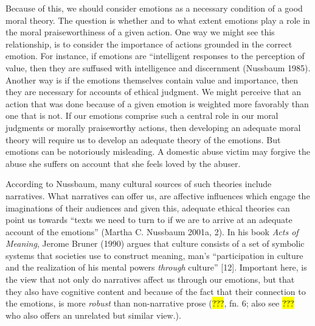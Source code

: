 \documentclass[
  letterpaper,
  DIV=11,
  numbers=noendperiod]{scrartcl}
\theoremstyle{remark}
\begin{document}
Because of this, we should consider emotions as a necessary condition of
a good moral theory. The question is whether and to what extent emotions
play a role in the moral praiseworthiness of a given action. One way we
might see this relationship, is to consider the importance of actions
grounded in the correct emotion. For instance, if emotions are
``intelligent responses to the perception of value, then they are
suffused with intelligence and discernment (Nussbaum 1985). Another way
is if the emotions themselves contain value and importance, then they
are necessary for accounts of ethical judgment. We might perceive that
an action that was done because of a given emotion is weighted more
favorably than one that is not. If our emotions comprise such a central
role in our moral judgments or morally praiseworthy actions, then
developing an adequate moral theory will require us to develop an
adequate theory of the emotions. But emotions can be notoriously
misleading. A domestic abuse victim may forgive the abuse she suffers on
account that she feels loved by the abuser.

According to Nussbaum, many cultural sources of such theories include
narratives. What narratives can offer us, are affective influences which
engage the imaginations of their audiences and given this, adequate
ethical theories can point us towards ``texts we need to turn to if we
are to arrive at an adequate account of the emotions'' (Martha C.
Nussbaum 2001a, 2). In his book \emph{Acts of Meaning}, Jerome Bruner
(1990) argues that culture consists of a set of symbolic systems that
societies use to construct meaning, man's ``participation in culture and
the realization of his mental powers \emph{through} culture'' {[}12{]}.
Important here, is the view that not only do narratives affect us
through our emotions, but that they also have cognitive content and
because of the fact that their connection to the emotions, is more
\emph{robust} than non-narrative prose (\hl{???}, fn. 6; also see
\hl{???} who also offers an unrelated but similar view.).
\end{document}
